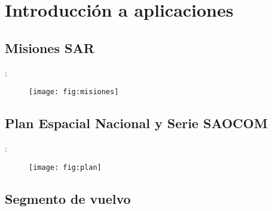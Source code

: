 \section{Introducción a aplicaciones}
\subsection{Misiones SAR}
\begin{frame}{\secname : \subsecname}
  \begin{figure}
    \centering
    \texttt{[image: fig:misiones]}
    \caption{}
    \label{}
  \end{figure}
\end{frame}

\subsection{Plan Espacial Nacional y Serie SAOCOM}
\begin{frame}{\secname : \subsecname}
  \begin{figure}
    \centering
    \texttt{[image: fig:plan]}
    \caption{}
    \label{}
  \end{figure}
\end{frame}
\subsection{Segmento de vuelvo}

